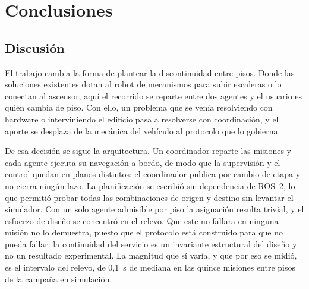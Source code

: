 %
%
\chapter*{Conclusiones}

\section*{Discusión}

El trabajo cambia la forma de plantear la discontinuidad entre pisos. Donde las soluciones
existentes dotan al robot de mecanismos para subir escaleras o lo conectan al ascensor, aquí el
recorrido se reparte entre dos agentes y el usuario es quien cambia de piso. Con ello, un problema
que se venía resolviendo con hardware o interviniendo el edificio pasa a resolverse con
coordinación, y el aporte se desplaza de la mecánica del vehículo al protocolo que lo gobierna.

De esa decisión se sigue la arquitectura. Un coordinador reparte las misiones y cada agente ejecuta
su navegación a bordo, de modo que la supervisión y el control quedan en planos distintos: el
coordinador publica por cambio de etapa y no cierra ningún lazo. La planificación se escribió sin
dependencia de ROS~2, lo que permitió probar todas las combinaciones de origen y destino sin
levantar el simulador. Con un solo agente admisible por piso la asignación resulta trivial, y el esfuerzo de
diseño se concentró en el relevo. Que este no fallara en ninguna misión no lo demuestra, puesto que el
protocolo está construido para que no pueda fallar: la continuidad del servicio es un invariante
estructural del diseño y no un resultado experimental. La magnitud que sí varía, y que por eso se midió,
es el intervalo del relevo, de 0,1~s de mediana en las quince misiones entre pisos de la campaña en
simulación.

